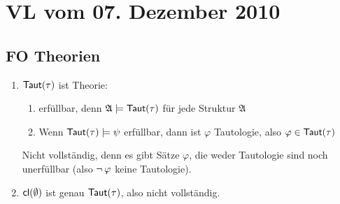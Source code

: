 \section{VL vom 07. Dezember 2010}

\subsection{FO Theorien}

\begin{enumerate}
  \item $\operatorname{\text{\textsf{Taut}}}(\tau)$ ist Theorie:
  \begin{enumerate}
    \item erfüllbar, denn $\mathfrak{A}\models\operatorname{\text{\textsf{Taut}}}(\tau)$ für jede Struktur $\mathfrak{A}$
    \item Wenn $\operatorname{\text{\textsf{Taut}}}(\tau)\models\psi$ erfüllbar, dann ist $\varphi$ Tautologie, also $\varphi\in\operatorname{\text{\textsf{Taut}}}(\tau)$
  \end{enumerate}
  
  Nicht vollständig, denn es gibt Sätze $\varphi$, die weder Tautologie sind noch unerfüllbar
  (also $\operatorname{\neg}\varphi$ keine Tautologie).
  
  \item $\operatorname{\text{\textsf{cl}}}(\emptyset)$ ist genau $\operatorname{\text{\textsf{Taut}}}(\tau)$, also nicht vollständig.
\end{enumerate}


